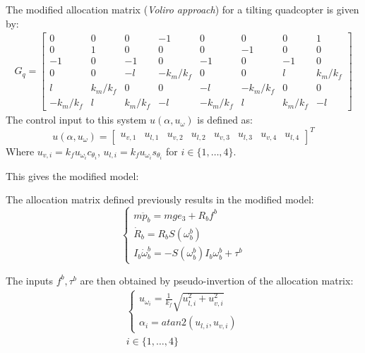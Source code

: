 \begin{definition}\label{UAV_tilting_allocation_matrix_Voliro_approach_def}
    The modified allocation matrix (\textit{Voliro approach}) for a tilting quadcopter is given by:
    \begin{gather}\label{UAV_tilting_allocation_matrix_Voliro_approach}
        G_q=
        \begin{bmatrix}
            0 & 0 & 0 & -1 & 0 & 0 & 0 &1\\
            0 & 1 & 0 & 0 & 0 & -1 & 0 & 0\\
            -1 & 0 & -1 & 0 & -1 & 0 & -1 & 0\\
            0 & 0 & -l & -k_{m}/k_{f} & 0 & 0 & l & k_{m}/k_{f} \\
            l & k_{m}/k_{f} & 0 & 0 & -l & -k_{m}/k_{f} & 0 & 0\\
            -k_{m}/k_{f} & l & k_{m}/k_{f} & -l & -k_{m}/k_{f} & l & k_{m}/k_{f} & -l
        \end{bmatrix}
    \end{gather}
    The control input to this system $u(\alpha,u_\omega)$ is defined as:
    \begin{equation*}
        u(\alpha,u_\omega)=
        \begin{bmatrix}
            u_{v,1} & u_{l,1} & u_{v,2} & u_{l,2} & u_{v,3} & u_{l,3} & u_{v,4} & u_{l,4}
        \end{bmatrix}^{T}
    \end{equation*}
    Where $u_{v,i}=k_{f} u_{\omega_i} c_{\theta_i}$, $u_{l,i}=k_{f} u_{\omega_i} s_{\theta_i}$ for $i\in\{1,\dots,4\}$.
\end{definition}
This gives the modified model:
\begin{definition}\label{UAV_tilting_model_modified_def}
    The allocation matrix defined previously results in the modified model:
    \begin{equation}\label{UAV_tilting_model_modified}
        \begin{cases}
            m\ddot{p}_b=mge_3+R_bf^b\\
            \dot{R}_b=R_bS\left(\omega_b^b\right)\\
            I_b\dot{\omega}_b^b=-S\left(\omega_b^b\right)I_b\omega_b^b+\tau^b
        \end{cases}
    \end{equation}
\end{definition}
The inputs $f^b,\tau^b$ are then obtained by pseudo-invertion of the allocation matrix:
\begin{gather*}
    \begin{cases}
        u_{\omega_i}=\frac{1}{k_{f}}\sqrt{u_{l,i}^{2}+u_{v,i}^2}\\
        \alpha_i=atan2(u_{l,i},u_{v,i})        
    \end{cases}\\
    i\in\{1,\dots,4\}
\end{gather*}
